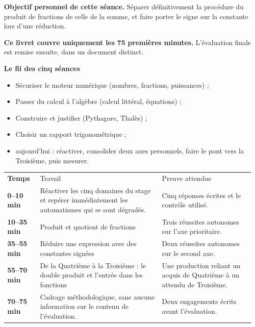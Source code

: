 \documentclass[10pt,a4paper]{article}
\begin{document}
\begin{goalbox}
\textbf{Objectif personnel de cette séance.} Séparer définitivement la procédure du produit de fractions de celle de la somme, et faire porter le signe sur la constante lors d'une réduction.
\par\medskip
\textbf{Ce livret couvre uniquement les 75 premières minutes.} L'évaluation finale est remise ensuite, dans un document distinct.
\end{goalbox}
\begin{methodbox}
\textbf{Le fil des cinq séances}
\begin{itemize}[leftmargin=13mm,labelsep=3mm,itemsep=1.5pt]
\item[\textbf{\color{Navy}S1}] Sécuriser le moteur numérique (nombres, fractions, puissances) ;
\item[\textbf{\color{Navy}S2}] Passer du calcul à l'algèbre (calcul littéral, équations) ;
\item[\textbf{\color{Navy}S3}] Construire et justifier (Pythagore, Thalès) ;
\item[\textbf{\color{Navy}S4}] Choisir un rapport trigonométrique ;
\item[\textbf{\color{Navy}S5}] aujourd'hui : réactiver, consolider deux axes personnels, faire le pont vers la Troisième, puis mesurer.
\end{itemize}
\end{methodbox}
\par\noindent\begin{tabularx}{\linewidth}{>{\bfseries}p{20mm} X X}
\rowcolor{Navy}\color{white}Temps & \color{white}Travail & \color{white}Preuve attendue \\
0--10 min & Réactiver les cinq domaines du stage et repérer immédiatement les automatismes qui se sont dégradés. & Cinq réponses écrites et le contrôle utilisé. \\
10--35 min & Produit et quotient de fractions & Trois réussites autonomes sur l'axe prioritaire. \\
35--55 min & Réduire une expression avec des constantes signées & Deux réussites autonomes sur le second axe. \\
55--70 min & De la Quatrième à la Troisième : le double produit et l'entrée dans les fonctions & Une production reliant un acquis de Quatrième à un attendu de Troisième. \\
70--75 min & Cadrage méthodologique, sans aucune information sur le contenu de l'évaluation. & Deux engagements écrits avant l'évaluation. \\
\end{tabularx}
\end{document}
